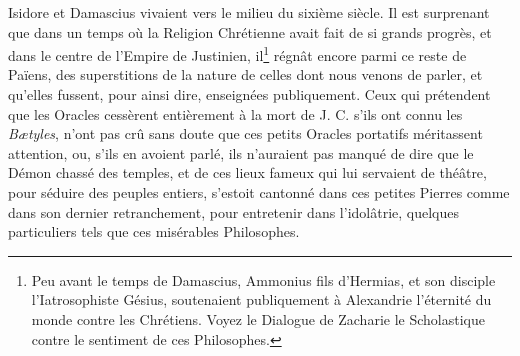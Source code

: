 \documentclass[a4paper, 11pt, oneside, polutonikogreek, french]{article}
\begin{document}
Isidore et Damascius vivaient vers le milieu du sixième siècle. Il est surprenant que dans un temps où la Religion Chrétienne avait fait de si grands progrès, et dans le centre de l'Empire de Justinien, il\footnote{Peu avant le temps de Damascius, Ammonius fils d'Hermias, et son disciple l'Iatrosophiste Gésius, soutenaient publiquement à Alexandrie l'éternité du monde contre les Chrétiens. Voyez le Dialogue de Zacharie le Scholastique contre le sentiment de ces Philosophes.} régnât encore parmi ce reste de Païens, des superstitions de la nature de celles dont nous venons de parler, et qu'elles fussent, pour ainsi dire, enseignées publiquement. Ceux qui prétendent que les Oracles cessèrent entièrement à la mort de J. C. s'ils ont connu les \emph{Bætyles}, n'ont pas crû sans doute que ces petits Oracles portatifs méritassent attention, ou, s'ils en avoient parlé, ils n'auraient pas manqué de dire que le Démon chassé des temples, et de ces lieux fameux qui lui servaient de théâtre, pour séduire des peuples entiers, s'estoit cantonné dans ces petites Pierres comme dans son dernier retranchement, pour entretenir dans l'idolâtrie, quelques particuliers tels que ces misérables Philosophes.
\end{document}
